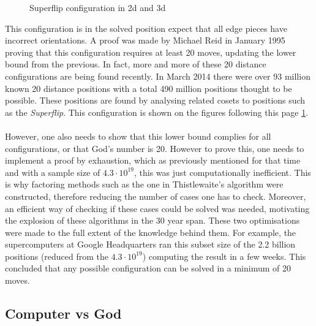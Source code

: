 \documentclass{article}
\newcounter{lem}[section]\setcounter{lem}{0}
\begin{document}
{\begin{figure}
    \caption{Superflip configuration in 2d and 3d}
    \label{fig:Superflipplot}
\end{figure}
\clearpage
}This configuration is in the solved position expect that all edge pieces have incorrect orientations. A proof was made by Michael Reid in January 1995 proving that this configuration requires at least 20 moves, updating the lower bound from the previous. In fact, more and more of these 20 distance configurations are being found recently. In March 2014 there were over 93 million known 20 distance positions with a total 490 million positions thought to be possible. These positions are found by analysing related cosets to positions such as the \textit{Superflip}\cite{20}. This configuration is shown on the figures following this page \ref{fig:Superflipplot}.
\paragraph*{}
However, one also needs to show that this lower bound complies for all configurations, or that God's number is 20\cite{God}.
However to prove this, one needs to implement a proof by exhaustion, which as previously mentioned for that time and with a sample size of $4.3 \cdot 10^{19}$, this was just computationally inefficient. This is why factoring methods such as the one in Thistlewaite's algorithm were constructed, therefore reducing the number of cases one has to check. Moreover, an efficient way of checking if these cases could be solved was needed, motivating the explosion of these algorithms in the 30 year span.
These two optimisations were made to the full extent of the knowledge behind them. For example, the supercomputers at Google Headquarters ran this subset size of the 2.2 billion positions (reduced from the $4.3\cdot 10^{19}$) computing the result in a few weeks. This concluded that any possible configuration can be solved in a minimum of 20 moves. 
\newpage
\subsection{Computer vs God}
\end{document}
